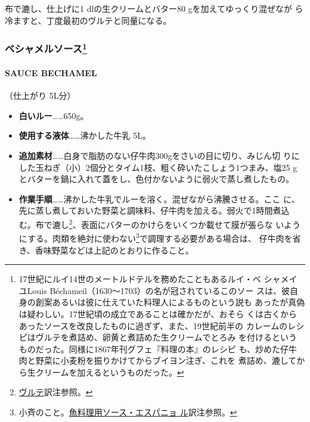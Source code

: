 \begin{recette}
布で漉し、仕上げに1 dlの生クリームとバター80 gを加えてゆっくり混ぜなが
ら冷ますと、丁度最初のヴルテと同量になる。

\maeaki

\hypertarget{ux30d9ux30b7ux30e3ux30e1ux30ebux30bdux30fcux30b9102020}{%
\subsubsection[ベシャメルソース]{\texorpdfstring{ベシャメルソース\footnote{17世紀にルイ14世のメートルドテルを務めたこともあるルイ・ベ
  シャメイユLouis Béchameil（1630〜1703）の名が冠されているこのソー
  スは、彼自身の創案あるいは彼に仕えていた料理人によるものという説も
  あったが真偽は疑わしい。17世紀頃の成立であることは確かだが、おそら
  くは古くからあったソースを改良したものに過ぎず、また、19世紀前半の
  カレームのレシピはヴルテを煮詰め、卵黄と煮詰めた生クリームでとろみ
  を付けるというものだった。同様に1867年刊グフェ『料理の本』のレシピ
  も、炒めた仔牛肉と野菜に小麦粉を振りかけてからブイヨン注ぎ、これを
  煮詰め、漉してから生クリームを加えるというものだった。}}{ベシャメルソース}}\label{ux30d9ux30b7ux30e3ux30e1ux30ebux30bdux30fcux30b9102020}}

\hypertarget{sauce-bechamel}{%
\paragraph{SAUCE BECHAMEL}\label{sauce-bechamel}}

   

（仕上がり 5L分）

\begin{itemize}
\item
  \textbf{白いルー}\ldots{}\ldots{}650g。
\item
  \textbf{使用する液体}\ldots{}\ldots{}沸かした牛乳 5L。
\item
  \textbf{追加素材}\ldots{}\ldots{}白身で脂肪のない仔牛肉300gをさいの目に切り、みじん切
  りにした玉ねぎ（小）2個分とタイム1枝、粗く砕いたこしょう1つまみ、塩25
  gとバターを鍋に入れて蓋をし、色付かないように弱火で蒸し煮したもの。
\item
  \textbf{作業手順}\ldots{}\ldots{}沸かした牛乳でルーを溶く。混ぜながら沸騰させる。ここ
  に、先に蒸し煮しておいた野菜と調味料、仔牛肉を加える。弱火で1時間煮込
  む。布で漉し\footnote{\protect\hyperlink{veloute}{ヴルテ}訳注参照。}、表面にバターのかけらをいくつか載せて膜が張らな
  いようにする。肉類を絶対に使わない\footnote{小斉のこと。\protect\hyperlink{sauce-espagnole-maigre}{魚料理用ソース・エスパニョ
    ル}訳注参照。}で調理する必要がある場合は、
  仔牛肉を省き、香味野菜などは上記のとおりに作ること。
\end{itemize}


\end{recette}
